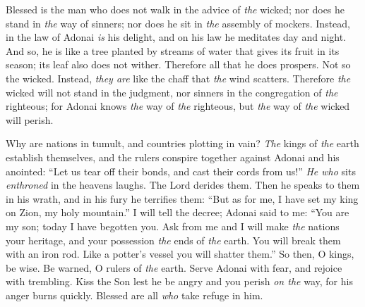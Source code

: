 
\begin{biblechapter} %
 Blessed is the man who does not walk in the advice of \textit{the} wicked; 
nor does he stand in \textit{the} way of sinners; 
nor does he sit in \textit{the} assembly of mockers.
\verse Instead, in the law of Adonai \textit{is} his delight, 
and on his law he meditates day and night.
\verse And so, he is like a tree planted by streams of water 
that gives its fruit in its season; 
its leaf also does not wither. 
Therefore all that he does prospers.
\verse Not so the wicked. 
Instead, \textit{they are} like the chaff that \textit{the} wind scatters.
\verse Therefore \textit{the} wicked will not stand in the judgment, 
nor sinners in the congregation of \textit{the} righteous;
\verse for Adonai knows \textit{the} way of \textit{the} righteous, 
but \textit{the} way of \textit{the} wicked will perish.
\end{biblechapter}

\begin{biblechapter} %
 Why are nations in tumult, 
and countries plotting in vain?
\verse \textit{The} kings of \textit{the} earth establish themselves, 
and the rulers conspire together 
against Adonai and his anointed:
\verse “Let us tear off their bonds, 
and cast their cords from us!”
\verse \textit{He who} sits \textit{enthroned} in the heavens laughs. 
The Lord derides them.
\verse Then he speaks to them in his wrath, 
and in his fury he terrifies them:
\verse “But as for me, I have set my king 
on Zion, my holy mountain.”
\verse I will tell the decree; 
Adonai said to me: 
“You are my son; 
today I have begotten you.
\verse Ask from me and I will make \textit{the} nations your heritage, 
and your possession \textit{the} ends of \textit{the} earth.
\verse You will break them with an iron rod. 
Like a potter’s vessel you will shatter them.”
\verse So then, O kings, be wise. 
Be warned, O rulers of \textit{the} earth.
\verse Serve Adonai with fear, 
and rejoice with trembling.
\verse Kiss the Son 
lest he be angry and you perish \textit{on the} way, 
for his anger burns quickly. 
Blessed are all \textit{who} take refuge in him.
\end{biblechapter}

